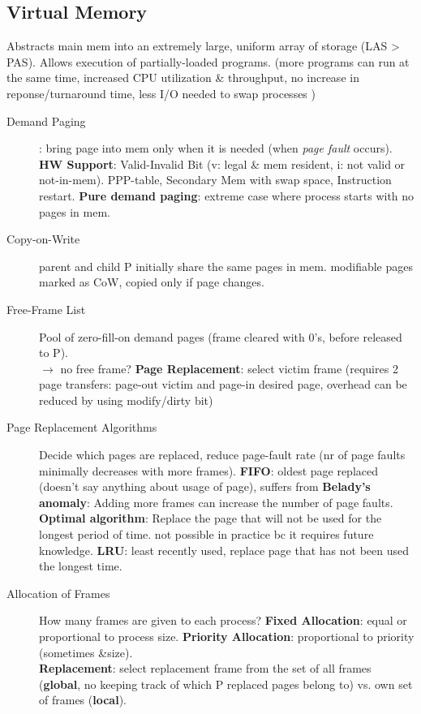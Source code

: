 \subsection*{Virtual Memory}
Abstracts main mem into an extremely large, uniform array of storage (LAS > PAS). Allows execution of partially-loaded programs. (more programs can run at the same time, increased CPU utilization \& throughput, no increase in reponse/turnaround time, less I/O needed to swap processes )
\begin{description}
    \item[Demand Paging]: bring page into mem only when it is needed (when \textit{page fault} occurs). \textbf{HW Support}: Valid-Invalid Bit (v: legal & mem resident, i: not valid or not-in-mem). PPP-table, Secondary Mem with swap space, Instruction restart. \textbf{Pure demand paging}: extreme case where process starts with no pages in mem.
    \item[Copy-on-Write]parent and child P initially share the same pages in mem. modifiable pages marked as CoW, copied only if page changes.
    \item[Free-Frame List]Pool of zero-fill-on demand pages (frame cleared with 0's, before released to P). \\ %
    $\rightarrow$ no free frame? \textbf{Page Replacement}: select victim frame (requires 2 page transfers: page-out victim and page-in desired page, overhead can be reduced by using modify/dirty bit) %
    \item[Page Replacement Algorithms] Decide which pages are replaced, reduce page-fault rate (nr of page faults minimally decreases with more frames). \textbf{FIFO}: oldest page replaced (doesn't say anything about usage of page), suffers from \textbf{Belady's anomaly}: Adding more frames can increase the number of page faults. \textbf{Optimal algorithm}: Replace the page that will not be used for the longest period of time. not possible in practice bc it  requires future knowledge. \textbf{LRU}: least recently used, replace page that has not been used the longest time.
    \item[Allocation of Frames]How many frames are given to each process? \textbf{Fixed Allocation}: equal or proportional to process size. \textbf{Priority Allocation}: proportional to priority (sometimes &size). \\
        \textbf{Replacement}: select replacement frame from the set of all frames (\textbf{global}, no keeping track of which P replaced pages belong to) vs. own set of frames (\textbf{local}).

\end{description}
